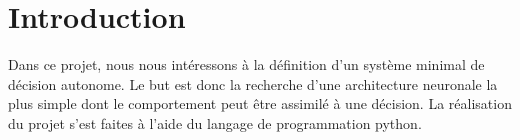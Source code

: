 \section*{Introduction}

Dans ce projet, nous nous intéressons à la définition d'un système minimal de décision autonome.
Le but est donc la recherche d'une architecture neuronale la plus simple dont le comportement peut être assimilé à une décision.
La réalisation du projet s'est faites à l'aide du langage de programmation python.


